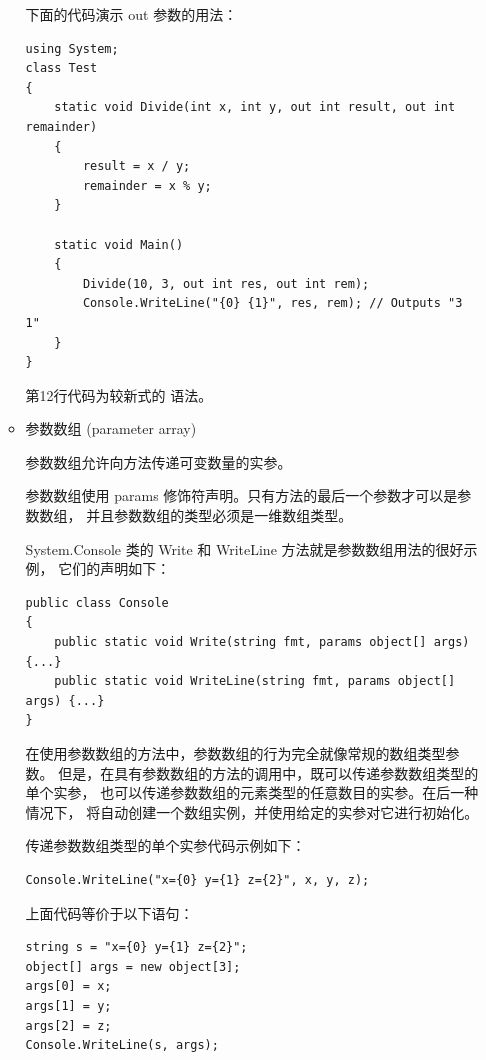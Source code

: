 \begin{itemize}
\begin{itemize}
    下面的代码演示 out 参数的用法：

\begin{lstlisting}
using System;
class Test
{
    static void Divide(int x, int y, out int result, out int remainder) 
    {
        result = x / y;
        remainder = x % y;
    }

    static void Main() 
    {
        Divide(10, 3, out int res, out int rem);
        Console.WriteLine("{0} {1}", res, rem); // Outputs "3 1"
    }
}
\end{lstlisting}

    第12行代码为较新式的 \cs 语法。

	\item 参数数组 (parameter array)

    参数数组允许向方法传递可变数量的实参。

    参数数组使用 params 修饰符声明。只有方法的最后一个参数才可以是参数数组，
    并且参数数组的类型必须是一维数组类型。

    System.Console 类的 Write 和 WriteLine 方法就是参数数组用法的很好示例，
    它们的声明如下：

\begin{lstlisting}
public class Console
{
    public static void Write(string fmt, params object[] args) {...}
    public static void WriteLine(string fmt, params object[] args) {...}
}
\end{lstlisting}

    在使用参数数组的方法中，参数数组的行为完全就像常规的数组类型参数。
    但是，在具有参数数组的方法的调用中，既可以传递参数数组类型的单个实参，
    也可以传递参数数组的元素类型的任意数目的实参。在后一种情况下，
    将自动创建一个数组实例，并使用给定的实参对它进行初始化。

    传递参数数组类型的单个实参代码示例如下：

\begin{lstlisting}
Console.WriteLine("x={0} y={1} z={2}", x, y, z);
\end{lstlisting}

    上面代码等价于以下语句：

\begin{lstlisting}
string s = "x={0} y={1} z={2}";
object[] args = new object[3];
args[0] = x;
args[1] = y;
args[2] = z;
Console.WriteLine(s, args);
\end{lstlisting}

    \end{itemize}

\end{itemize}

